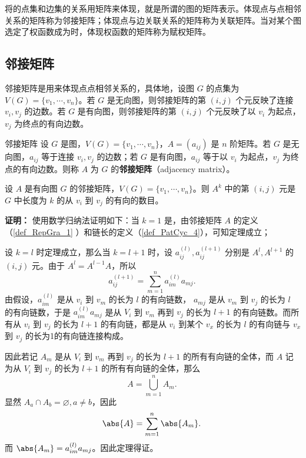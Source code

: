 
将的点集和边集的关系用矩阵来体现，就是所谓的图的矩阵表示。体现点与点相邻关系的矩阵称为邻接矩阵；体现点与边关联关系的矩阵称为关联矩阵。当对某个图选定了权函数成为时，体现权函数的矩阵称为赋权矩阵。

\subsection{邻接矩阵}
邻接矩阵是用来体现点点相邻关系的，具体地，设图 $G$ 的点集为 $V(G)=\{v_1,\cdots,v_n\}$。若 $G$ 是无向图，则邻接矩阵的第 $(i,j)$ 个元反映了连接 $v_i,v_j$ 的边数。若 $G$ 是有向图，则邻接矩阵的第 $(i,j)$ 个元反映了以 $v_i$ 为起点，$v_j$ 为终点的有向边数。
\begin{definition}{邻接矩阵}\label{def_RepGra_1}
设 $G$ 是图，$V(G)=\{v_1,\cdots,v_n\}$，$A=(a_{ij})$ 是 $n$ 阶矩阵。若 $G$ 是无向图，$a_{ij}$ 等于连接 $v_i,v_j$ 的边数；若 $G$ 是有向图，$a_{ij}$ 等于以 $v_i$ 为起点，$v_j$ 为终点的有向边数。则称 $A$ 为 $G$ 的\textbf{邻接矩阵}（adjacency matrix）。
\end{definition}

\begin{theorem}{}
设 $A$ 是有向图 $G$ 的邻接矩阵，$V(G)=\{v_1,\cdots,v_n\}$。则 $A^k$ 中的第 $(i,j)$ 元是 $G$ 中长度为 $k$ 的从 $v_i$ 到 $v_j$ 的有向的数目。
\end{theorem}
\textbf{证明：}
使用数学归纳法证明如下：当 $k=1$ 是，由邻接矩阵 $A$ 的定义（\autoref{def_RepGra_1} ）和链长的定义（\autoref{def_PatCyc_4}），可知定理成立；

设 $k=l$ 时定理成立，那么当 $k=l+1$ 时，设 $a_{ij}^{(l)},a_{ij}^{(l+1)}$ 分别是 $A^{l},A^{l+1}$ 的 $(i,j)$ 元。由于 $A^l=A^{l-1}A$，所以
\begin{equation}
a_{ij}^{(l+1)}=\sum_{m=1}^na_{im}^{(l)}a_{mj}.~
\end{equation}
由假设，$a_{im}^{(l)}$ 是从 $v_i$ 到 $v_m$ 的长为 $l$ 的有向链数， $a_{mj}$ 是从 $v_m$ 到 $v_j$ 的长为 $l$ 的有向链数，于是 $a_{im}^{(l)}a_{mj}$ 是从 $V_i$ 到 $v_m$ 再到 $v_j$ 的长为 $l+1$ 的有向链数。而所有从 $v_i$ 到 $v_j$ 的长为 $l+1$ 的有向链，都是从 $v_i$ 到某个 $v_x$ 的长为 $l$ 的有向链与 $v_x$ 到 $v_j$ 的长为1的有向链连接构成。

因此若记 $A_m$ 是从 $V_i$ 到 $v_m$ 再到 $v_j$ 的长为 $l+1$ 的所有有向链的全体，而 $A$ 记为从 $V_i$ 到 $v_j$ 的长为 $l+1$ 的所有有向链的全体，那么
\begin{equation}
A=\bigcup_{m=1}^n A_m.~
\end{equation}
显然 $A_a\cap A_b=\varnothing,a\neq b$，因此
\begin{equation}
\abs{A}=\sum_{m=1}^n \abs{A_m}.~
\end{equation}
而 $\abs{A_m}=a_{im}^{(l)}a_{mj}$。因此定理得证。


